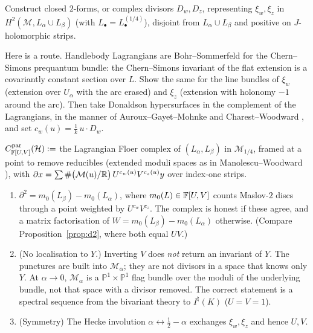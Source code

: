 \begin{problem}\label{prob:relative}
Construct closed $2$-forms, or complex divisors $D_w,D_z$, representing $\xi_w,\xi_z$ in
$H^2(\mathcal M,L_\alpha\cup L_\beta)$ (with $L_\bullet=L_\bullet^{(1/4)}$), disjoint from $L_\alpha\cup L_\beta$ and positive on
$J$-holomorphic strips.
\end{problem}
Here is a route.  Handlebody Lagrangians are Bohr--Sommerfeld for the Chern--Simons prequantum bundle: the
Chern--Simons invariant of the flat extension is a covariantly constant section over $L$.  Show the same for the line bundles of $\xi_w$ (extension
over $U_\alpha$ with the arc erased) and $\xi_z$ (extension with holonomy $-1$ around the arc).  Then take
Donaldson hypersurfaces in the complement of the Lagrangians, in the manner of Auroux--Gayet--Mohnke \cite{AGM} and
Charest--Woodward \cite{CW}, and set $c_w(u)=\frac1k\,u\cdot D_w$.

\begin{definition}
$C^{\rm par}_{\mathbb{F}[U,V]}(\mathcal H):=$ the Lagrangian Floer complex of $(L_\alpha,L_\beta)$ in $\mathcal M_{1/4}$, framed at a
point to remove reducibles (extended moduli spaces as in Manolescu--Woodward \cite{MW}), with
$\partial x=\sum\#\big(\mathcal{M}(u)/\mathbb{R}\big)\,U^{c_w(u)}V^{c_z(u)}y$ over index-one strips.
\end{definition}

\begin{conjecture}\label{conj:symp}
\begin{enumerate}[label=(\alph*)]
\item $\partial^2=m_0(L_\beta)-m_0(L_\alpha)$, where $m_0(L)\in\mathbb{F}[U,V]$ counts Maslov-$2$ discs through a point weighted
by $U^{c_w}V^{c_z}$.  The complex is honest if these agree, and a matrix factorisation of
$W=m_0(L_\beta)-m_0(L_\alpha)$ otherwise.  (Compare Proposition~\ref{prop:d2}, where both equal $UV$.)
\item \textup{(No localisation to $Y$.)}  Inverting $V$ does \emph{not} return an invariant of $Y$.  The punctures are
built into $\mathcal M_\alpha$; they are not divisors in a space that knows only $Y$.  At $\alpha\to0$, $\mathcal M_\alpha$ is a
$\mathbb P^1\times\mathbb P^1$ flag bundle over the moduli of the underlying bundle, not that space with a
divisor removed.  The correct statement is a spectral sequence from the bivariant theory to $I^\natural(K)$
($U=V=1$).
\item \textup{(Symmetry)} The Hecke involution $\alpha\leftrightarrow\tfrac12-\alpha$ exchanges $\xi_w,\xi_z$ and hence $U,V$.
\end{enumerate}
\end{conjecture}


